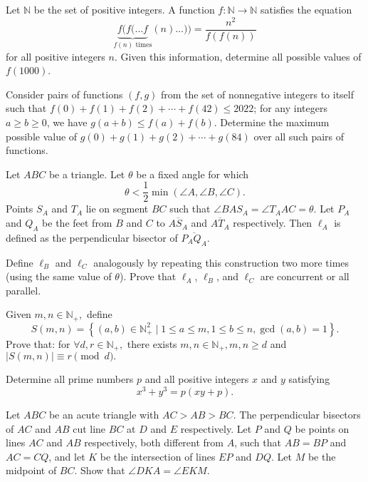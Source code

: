 \documentclass[11pt]{scrartcl}
\begin{document}
\begin{problem}[18644549011438]
Let $\mathbb{N}$ be the set of positive integers. A function $f:\mathbb{N}\to\mathbb{N}$ satisfies the equation\[\underbrace{f(f(\ldots f}_{f(n)\text{ times}}(n)\ldots))=\frac{n^2}{f(f(n))}\]for all positive integers $n$. Given this information, determine all possible values of $f(1000)$.
\end{problem}
\begin{problem}[20663652231924]
Consider pairs of functions $(f, g)$ from the set of nonnegative integers to itself such that
$f(0) + f(1) + f(2) + \cdots + f(42) \le 2022$;
for any integers $a \ge b \ge 0$, we have $g(a+b) \le f(a) + f(b)$.
Determine the maximum possible value of $g(0) + g(1) + g(2) + \cdots + g(84)$ over all such pairs of functions.
\end{problem}
\begin{problem}[23047452603115]
Let $ABC$ be a triangle. Let $\theta$ be a fixed angle for which\[\theta<\frac12\min(\angle A,\angle B,\angle C).\]Points $S_A$ and $T_A$ lie on segment $BC$ such that $\angle BAS_A=\angle T_AAC=\theta$. Let $P_A$ and $Q_A$ be the feet from $B$ and $C$ to $\overline{AS_A}$ and $\overline{AT_A}$ respectively. Then $\ell_A$ is defined as the perpendicular bisector of $\overline{P_AQ_A}$.

Define $\ell_B$ and $\ell_C$ analogously by repeating this construction two more times (using the same value of $\theta$). Prove that $\ell_A$, $\ell_B$, and $\ell_C$ are concurrent or all parallel.
\end{problem}
\begin{problem}[23355749604234]
	Given $m,n\in\mathbb N_+,$ define
$$S(m,n)=\left\{(a,b)\in\mathbb N_+^2\mid 1\leq a\leq m,1\leq b\leq n,\gcd (a,b)=1\right\}.$$Prove that: for $\forall d,r\in\mathbb N_+,$ there exists $m,n\in\mathbb N_+,m,n\geq d$ and $\left|S(m,n)\right|\equiv r\pmod d.$
\end{problem}
\begin{problem}[25177681716771]
Determine all prime numbers $p$ and all positive integers $x$ and $y$ satisfying$$x^3+y^3=p(xy+p).$$
\end{problem}
\begin{problem}[27464517430039]
	Let $ABC$ be an acute triangle with $AC > AB > BC$. The perpendicular bisectors of $AC$ and $AB$ cut line $BC$ at $D$ and $E$ respectively. Let $P$ and $Q$ be points on lines $AC$ and $AB$ respectively, both different from $A$, such that $AB = BP$ and $AC = CQ$, and let $K$ be the intersection of lines $EP$ and $DQ$. Let $M$ be the midpoint of $BC$. Show that $\angle DKA = \angle EKM$.
\end{problem}
\end{document}
